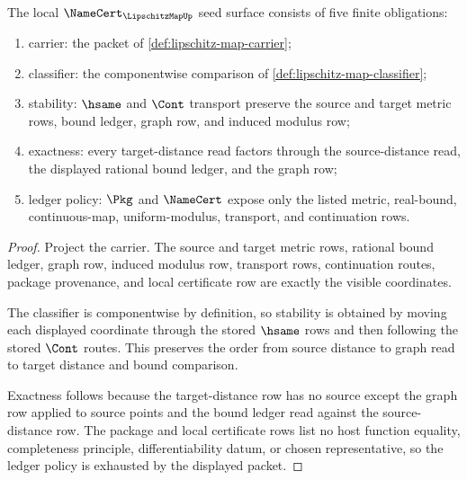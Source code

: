 \begin{theorem}
\label{thm:lipschitz-map-namecert-obligations}
The local $\NameCert_{\LipschitzMapUp}$ seed surface consists of five finite
obligations:
\begin{enumerate}
\item carrier: the packet of \autoref{def:lipschitz-map-carrier};
\item classifier: the componentwise comparison of
\autoref{def:lipschitz-map-classifier};
\item stability: $\hsame$ and $\Cont$ transport preserve the source and target
metric rows, bound ledger, graph row, and induced modulus row;
\item exactness: every target-distance read factors through the source-distance
read, the displayed rational bound ledger, and the graph row;
\item ledger policy: $\Pkg$ and $\NameCert$ expose only the listed metric,
real-bound, continuous-map, uniform-modulus, transport, and continuation rows.
\end{enumerate}
\end{theorem}
\begin{proof}
Project the carrier. The source and target metric rows, rational bound ledger,
graph row, induced modulus row, transport rows, continuation routes, package
provenance, and local certificate row are exactly the visible coordinates.

The classifier is componentwise by definition, so stability is obtained by
moving each displayed coordinate through the stored $\hsame$ rows and then
following the stored $\Cont$ routes. This preserves the order from source
distance to graph read to target distance and bound comparison.

Exactness follows because the target-distance row has no source except the
graph row applied to source points and the bound ledger read against the
source-distance row. The package and local certificate rows list no host
function equality, completeness principle, differentiability datum, or chosen
representative, so the ledger policy is exhausted by the displayed packet.
\end{proof}

